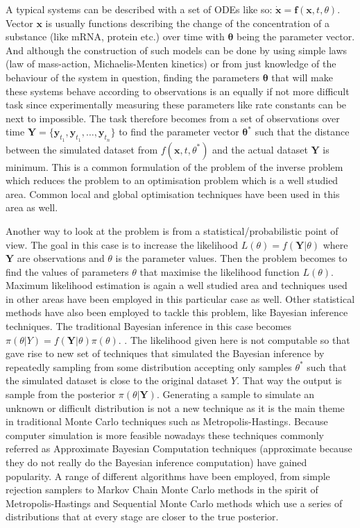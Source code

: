 \documentclass[12pt,a4paper,titlepage]{article}
\begin{document}
A typical systems can be described with a set of ODEs like so: 
$
\mathbf{\dot x} = \mathbf{f}(\mathbf{x}, t, \theta)
$. 
Vector $\mathbf{x}$ is usually functions describing the change of the concentration of a substance (like mRNA, protein etc.) over time with $\mathbf{\theta}$ being the parameter vector. And although the construction of such models can be done by using simple laws (law of mass-action, Michaelis-Menten kinetics) or from just knowledge of the behaviour of the system in question, finding the parameters $\mathbf{\theta}$ that will make these systems behave according to observations is an equally if not more difficult task since experimentally measuring these parameters like rate constants can be next to impossible. The task therefore becomes from a set of observations over time $\mathbf{Y} = \{\mathbf{y}_{t_{1}}, \mathbf{y}_{t_{1}}, \dots, \mathbf{y}_{t_{n}}\} $ to find the parameter vector $\mathbf{\theta}^*$ such that the distance between the simulated dataset from $f(\mathbf{x}, t, \theta^*)$ and the actual dataset $\mathbf{Y}$ is minimum. This is a common formulation of the problem of the inverse problem which reduces the problem to an optimisation problem which is a well studied area\cite{gonze2011modeling}. Common local and global optimisation techniques have been used in this area as well\cite{moles2003parameter}.

Another way to look at the problem is from a statistical/probabilistic point of view. The goal in this case is to increase the likelihood $L(\theta) = f(\mathbf{Y}|\theta)$ where $\mathbf{Y}$ are observations and $\theta$ is the parameter values\cite{filippi2011optimal}. Then the problem becomes to find the values of parameters $\theta$ that maximise the likelihood function $L(\theta)$. Maximum likelihood estimation is again a well studied area and techniques used in other areas have been employed in this particular case as well.%
Other statistical methods have also been employed to tackle this problem, like Bayesian inference techniques. The traditional Bayesian inference in this case becomes $\pi(\theta| Y)  = f(\mathbf{Y} |\theta) \pi(\theta)$. \cite{toni2009abc}. The likelihood given here is not computable so that gave rise to new set of techniques that simulated the Bayesian inference by repeatedly sampling from some distribution accepting only samples  $\theta^*$ such that the simulated dataset is close to the original dataset $Y$. That way the output is sample from the posterior $\pi(\theta | \mathbf{Y})$. Generating a sample to simulate an unknown or difficult distribution is not a new technique as it is the main theme in traditional Monte Carlo techniques such as Metropolis-Hastings\cite{Walsh04markovchain}. Because computer simulation is more feasible nowadays these techniques commonly referred as Approximate Bayesian Computation techniques (approximate because they do not really do the Bayesian inference computation) have gained popularity. A range of different algorithms have been employed, from simple rejection samplers\cite{pritchard1999population} to Markov Chain Monte Carlo methods in the spirit of Metropolis-Hastings\cite{marjoram2003markov} and Sequential Monte Carlo methods which use a series of distributions that at every stage are closer to the true posterior\cite{toni2009abc}.
\end{document}

